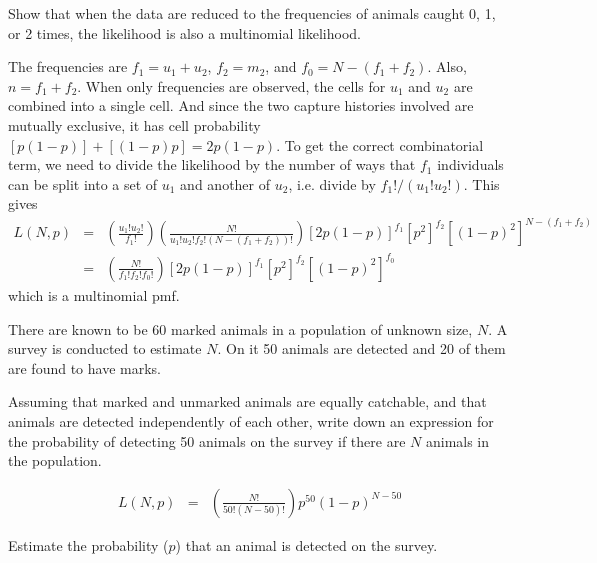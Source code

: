 \begin{questions}
\begin{parts}
\item Show that when the data are reduced to the frequencies of animals caught 0, 1, or 2 times, the likelihood is also a multinomial likelihood.

{\begin{solution}
The frequencies are $f_1=u_1+u_2$, $f_2=m_2$, and  $f_0=N-(f_1+f_2)$. Also, $n=f_1+f_2$. When only frequencies are observed, the cells for $u_1$ and $u_2$ are combined into a single cell. And since the two capture histories involved are mutually exclusive, it has cell probability $[p(1-p)]+[(1-p)p]=2p(1-p)$. To get the correct combinatorial term, we need to divide the likelihood by the number of ways that $f_1$ individuals can be split into a set of $u_1$ and another of $u_2$, i.e. divide by $f_1!/(u_1!u_2!)$. This gives
\begin{eqnarray*}
L(N,p)&=&\left(\frac{u_1!u_2!}{f_1!}\right)\left(\frac{N!}{u_1!u_2!f_2!(N-(f_1+f_2))!}\right)[2p(1-p)]^{f_1}[p^2]^{f_2}[(1-p)^2]^{N-(f_1+f_2)} \\
&=&\left(\frac{N!}{f_1!f_2!f_0!}\right)[2p(1-p)]^{f_1}[p^2]^{f_2}[(1-p)^2]^{f_0}
\end{eqnarray*}
\noindent
which is a multinomial pmf.

\end{solution}}

\end{parts}

\item There are known to be 60 marked animals in a population of unknown size, $N$. A survey is conducted to estimate $N$. On it 50 animals are detected and 20 of them are found to have marks.

\begin{parts}

\item Assuming that marked and unmarked animals are equally catchable, and that animals are detected independently of each other, write down an expression for the probability of detecting 50 animals on the survey if there are $N$ animals in the population.

{\begin{solution}
\begin{eqnarray*}
L(N,p)&=&\left(\frac{N!}{50!(N-50)!}\right)p^{50}(1-p)^{N-50}
\end{eqnarray*}
\end{solution}}

\item Estimate the probability ($p$) that an animal is detected on the survey.


\end{parts}
\end{questions}
